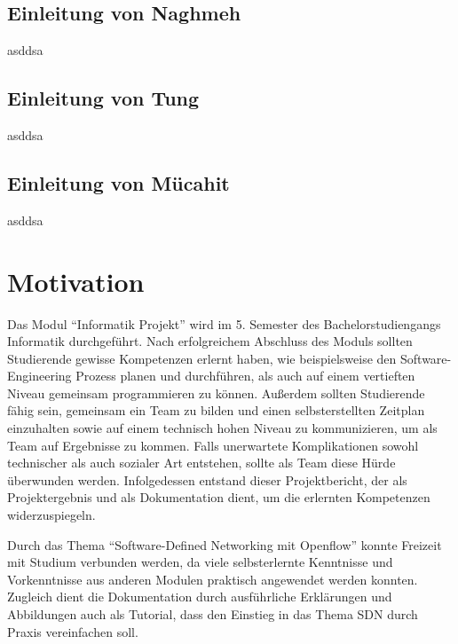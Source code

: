 \documentclass[fontsize=12pt,paper=a4,open=any,parskip=half,
  twoside=false,toc=listof,toc=bibliography,fleqn,leqno,
  captions=nooneline,captions=tableabove,british]{scrbook}
\begin{document}
\subsection{Einleitung von Naghmeh}\label{einl-naghmeh}
asddsa
\subsection{Einleitung von Tung}\label{einl-tung}
asddsa
\subsection{Einleitung von Mücahit}\label{einl-müco}
asddsa

\section{Motivation}
Das Modul “Informatik Projekt” wird im 5. Semester des Bachelorstudiengangs Informatik durchgeführt. Nach erfolgreichem Abschluss des Moduls sollten Studierende gewisse Kompetenzen erlernt haben, wie beispielsweise den Software-Engineering Prozess planen und durchführen, als auch auf einem vertieften Niveau gemeinsam programmieren zu können. Außerdem sollten Studierende fähig sein, gemeinsam ein Team zu bilden und einen selbsterstellten Zeitplan einzuhalten sowie auf einem technisch hohen Niveau zu kommunizieren, um als Team auf Ergebnisse zu kommen. Falls unerwartete Komplikationen sowohl technischer als auch sozialer Art entstehen, sollte als Team diese Hürde überwunden werden. Infolgedessen entstand dieser Projektbericht, der als Projektergebnis und als Dokumentation dient, um die erlernten Kompetenzen widerzuspiegeln.\par
Durch das Thema “Software-Defined Networking mit Openflow” konnte Freizeit mit Studium verbunden werden, da viele selbsterlernte Kenntnisse und Vorkenntnisse aus anderen Modulen praktisch angewendet werden konnten. Zugleich dient die Dokumentation durch ausführliche Erklärungen und Abbildungen auch als Tutorial, dass den Einstieg in das Thema SDN durch Praxis vereinfachen soll.
\end{document}
